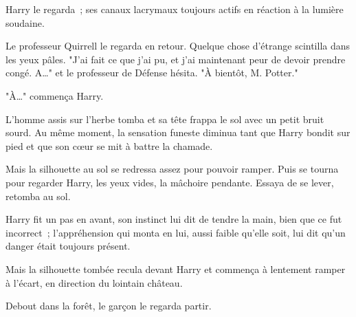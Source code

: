 Harry le regarda~; ses canaux lacrymaux toujours actifs en réaction à la lumière soudaine.

Le professeur Quirrell le regarda en retour. Quelque chose d'étrange scintilla dans les yeux pâles. "J'ai fait ce que j'ai pu, et j'ai maintenant peur de devoir prendre congé. A…" et le professeur de Défense hésita. "À bientôt, M. Potter."

"À…" commença Harry.

L'homme assis sur l'herbe tomba et sa tête frappa le sol avec un petit bruit sourd. Au même moment, la sensation funeste diminua tant que Harry bondit sur pied et que son cœur se mit à battre la chamade.

Mais la silhouette au sol se redressa assez pour pouvoir ramper. Puis se tourna pour regarder Harry, les yeux vides, la mâchoire pendante. Essaya de se lever, retomba au sol.

Harry fit un pas en avant, son instinct lui dit de tendre la main, bien que ce fut incorrect~; l'appréhension qui monta en lui, aussi faible qu'elle soit, lui dit qu'un danger était toujours présent.

Mais la silhouette tombée recula devant Harry et commença à lentement ramper à l'écart, en direction du lointain château.

Debout dans la forêt, le garçon le regarda partir. 

